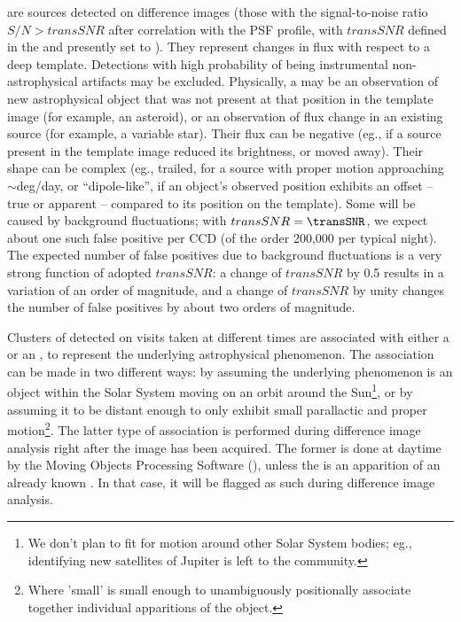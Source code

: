\documentclass[SE,lsstdraft,toc]{lsstdoc}
\begin{document}
\DIASources are sources detected on difference images (those with the signal-to-noise ratio $S/N>transSNR$ after correlation with the PSF profile, with $transSNR$ defined in the \SRD and presently set to \transSNR). They represent changes in flux with respect to a deep template. Detections with high probability of being instrumental non-astrophysical artifacts may be excluded. Physically, a \DIASource may be an observation of new astrophysical object that was not present at that position in the template image (for example, an asteroid), or an observation of flux change in an existing source (for example, a variable star). Their flux can be negative (eg., if a source present in the template image reduced its brightness, or moved away). Their shape can be complex (eg., trailed, for a source with proper motion approaching $\sim$deg/day, or ``dipole-like'', if an object's observed position exhibits an offset -- true or apparent -- compared to its position on the template).
Some \DIASources will be caused by background fluctuations; with $transSNR = \transSNR$,
we expect about one such false positive per CCD (of the order 200,000 per typical night). The expected number of false
positives due to background fluctuations is a very strong function of adopted $transSNR$: a change of $transSNR$ by 0.5
results in a variation of an order of magnitude, and a change of $transSNR$ by unity changes the number of false
positives by about two orders of magnitude.

Clusters of \DIASources detected on visits taken at different times are associated with either a \DIAObject or an \SSObject, to represent the underlying astrophysical phenomenon. The association can be made in two different ways: by assuming the underlying phenomenon is an object within the Solar System moving on an orbit around the Sun\footnote{We don't plan to fit for motion around other Solar System bodies; eg., identifying new satellites of Jupiter is left to the community.}, or by assuming it to be distant enough to only exhibit small parallactic and proper motion\footnote{Where 'small' is small enough to unambiguously positionally associate together individual apparitions of the object.}. The latter type of association is performed during difference image analysis right after the image has been acquired. The former is done at daytime by the Moving Objects Processing Software (), unless the \DIASource is an apparition of an already known \SSObject. In that case, it will be flagged as such during difference image analysis.
\end{document}
